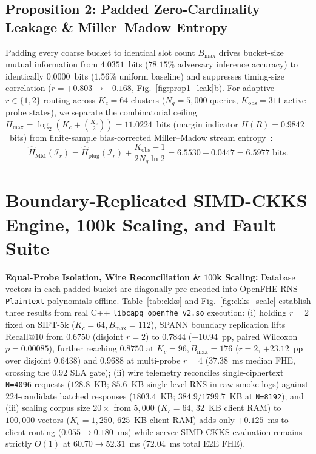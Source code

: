 \documentclass[10pt,journal,compsoc]{IEEEtran}
\begin{document}
\subsection{Proposition 2: Padded Zero-Cardinality Leakage \& Miller--Madow Entropy}
Padding every coarse bucket to identical slot count $B_{\max}$ drives bucket-size mutual information from $4.0351$~bits ($78.15\%$ adversary inference accuracy) to identically $0.0000$~bits ($1.56\%$ uniform baseline) and suppresses timing-size correlation ($r=+0.803\rightarrow +0.168$, Fig.~\ref{fig:prop1_leak}b). For adaptive $r \in \{1,2\}$ routing across $K_c=64$ clusters ($N_q=5{,}000$ queries, $K_{\mathrm{obs}}=311$ active probe states), we separate the combinatorial ceiling $H_{\max} = \log_2(K_c + \binom{K_c}{2}) = 11.0224$~bits (margin indicator $H(R)=0.9842$~bits) from finite-sample bias-corrected Miller--Madow stream entropy~\cite{miller1955note}:
\begin{equation}
\hat{H}_{\mathrm{MM}}(\mathcal{I}_r) = \hat{H}_{\mathrm{plug}}(\mathcal{I}_r) + \frac{K_{\mathrm{obs}}-1}{2 N_q \ln 2} = 6.5530 + 0.0447 = 6.5977\text{ bits}.
\label{eq:mm_v4}
\end{equation}

\section{Boundary-Replicated SIMD-CKKS Engine, 100k Scaling, and Fault Suite}\label{sec:system}
\textbf{Equal-Probe Isolation, Wire Reconciliation \& $100$k Scaling:} Database vectors in each padded bucket are diagonally pre-encoded into OpenFHE RNS \texttt{Plaintext} polynomials offline. Table~\ref{tab:ckks} and Fig.~\ref{fig:ckks_scale} establish three results from real C++ \texttt{libcapq\_openfhe\_v2.so} execution: (i) holding $r=2$ fixed on SIFT-5k ($K_c=64, B_{\max}=112$), SPANN boundary replication lifts $\text{Recall@10}$ from $0.6750$ (disjoint $r=2$) to $0.7844$ ($+10.94$~pp, paired Wilcoxon $p=0.00085$), further reaching $0.8750$ at $K_c=96, B_{\max}=176$ ($r=2$, $+23.12$~pp over disjoint $0.6438$) and $0.9688$ at multi-probe $r=4$ ($37.38$~ms median FHE, crossing the $0.92$ SLA gate); (ii) wire telemetry reconciles single-ciphertext \texttt{N=4096} requests ($128.8$~KB; $85.6$~KB single-level RNS in raw smoke logs) against $224$-candidate batched responses ($1803.4$~KB; $384.9 / 1799.7$~KB at \texttt{N=8192}); and (iii) scaling corpus size $20\times$ from $5{,}000$ ($K_c=64$, $32$~KB client RAM) to $100{,}000$ vectors ($K_c=1{,}250$, $625$~KB client RAM) adds only $+0.125$~ms to client routing ($0.055\rightarrow 0.180$~ms) while server SIMD-CKKS evaluation remains strictly $O(1)$ at $60.70\rightarrow 52.31$~ms ($72.04$~ms total E2E FHE).
\end{document}
